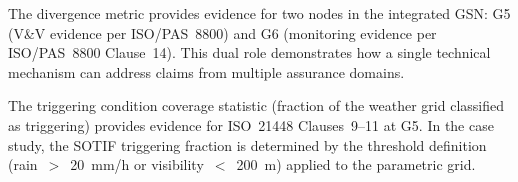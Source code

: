 The divergence metric provides evidence for two nodes in the integrated
GSN: G5 (V\&V evidence per ISO/PAS~8800) and G6 (monitoring evidence
per ISO/PAS~8800 Clause~14). This dual role demonstrates how a single
technical mechanism can address claims from multiple assurance domains.

The triggering condition coverage statistic (fraction of the weather
grid classified as triggering) provides evidence for ISO~21448
Clauses~9--11 at G5. In the case study, the SOTIF triggering fraction
is determined by the threshold definition (rain~$>$~20~mm/h or
visibility~$<$~200~m) applied to the parametric grid.
